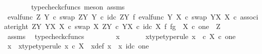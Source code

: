 \begin{isabellebody}
\ \ \ \ \ \ \isamarkupfalse%
\ {\isacharparenleft}{\kern0pt}typecheck{\isacharunderscore}{\kern0pt}cfuncs{\isacharcomma}{\kern0pt}\ meson\ assms{\isacharparenright}{\kern0pt}\isanewline
\ \ \ \ \isamarkupfalse%
\ {\isachardoublequoteopen}{\isacharparenleft}{\kern0pt}eval{\isacharunderscore}{\kern0pt}func\ Z\ Y\ {\isasymcirc}\isactrlsub c\ swap\ {\isacharparenleft}{\kern0pt}Z\isactrlbsup Y\isactrlesup {\isacharparenright}{\kern0pt}\ Y\ {\isasymcirc}\isactrlsub c\ {\isacharparenleft}{\kern0pt}id\isactrlsub c\ {\isacharparenleft}{\kern0pt}Z\isactrlbsup Y\isactrlesup {\isacharparenright}{\kern0pt}\ {\isasymtimes}\isactrlsub f\ eval{\isacharunderscore}{\kern0pt}func\ Y\ X\ {\isasymcirc}\isactrlsub c\ swap\ {\isacharparenleft}{\kern0pt}Y\isactrlbsup X\isactrlesup {\isacharparenright}{\kern0pt}\ X{\isacharparenright}{\kern0pt}\ {\isasymcirc}\isactrlsub c\ associate{\isacharunderscore}{\kern0pt}right\ {\isacharparenleft}{\kern0pt}Z\isactrlbsup Y\isactrlesup {\isacharparenright}{\kern0pt}\ {\isacharparenleft}{\kern0pt}Y\isactrlbsup X\isactrlesup {\isacharparenright}{\kern0pt}\ X\ {\isasymcirc}\isactrlsub c\ swap\ X\ {\isacharparenleft}{\kern0pt}Z\isactrlbsup Y\isactrlesup \ {\isasymtimes}\isactrlsub c\ Y\isactrlbsup X\isactrlesup {\isacharparenright}{\kern0pt}{\isacharparenright}{\kern0pt}\ {\isasymcirc}\isactrlsub c\ id\isactrlsub c\ X\ {\isasymtimes}\isactrlsub f\ {\isasymlangle}f{\isacharcomma}{\kern0pt}g{\isasymrangle}\ {\isacharcolon}{\kern0pt}\ X\ {\isasymtimes}\isactrlsub c\ one\ {\isasymrightarrow}\ Z{\isachardoublequoteclose}\isanewline
\ \ \ \ \ \ \isamarkupfalse%
\ assms\ \isamarkupfalse%
\ typecheck{\isacharunderscore}{\kern0pt}cfuncs\isanewline
\ \ \isamarkupfalse%
\isanewline
\ \ \ \ \isamarkupfalse%
\ x{}\ \isanewline
\ \ \ \ \isamarkupfalse%
\ x{}{\isacharunderscore}{\kern0pt}type{\isacharbrackleft}{\kern0pt}type{\isacharunderscore}{\kern0pt}rule{\isacharbrackright}{\kern0pt}{\isacharcolon}{\kern0pt}\ {\isachardoublequoteopen}x{}\ \ {\isasymin}\isactrlsub c\ X\ {\isasymtimes}\isactrlsub c\ one{\isachardoublequoteclose}\isanewline
\ \ \ \ \isamarkupfalse%
\ \isamarkupfalse%
\ x\ \ x{\isacharunderscore}{\kern0pt}type{\isacharbrackleft}{\kern0pt}type{\isacharunderscore}{\kern0pt}rule{\isacharbrackright}{\kern0pt}{\isacharcolon}{\kern0pt}\ {\isachardoublequoteopen}x\ {\isasymin}\isactrlsub c\ X{\isachardoublequoteclose}\ \ x{\isacharunderscore}{\kern0pt}def{\isacharcolon}{\kern0pt}\ {\isachardoublequoteopen}x{}\ {\isacharequal}{\kern0pt}\ {\isasymlangle}x{\isacharcomma}{\kern0pt}\ id\isactrlsub c\ one{\isasymrangle}{\isachardoublequoteclose}\isanewline

\end{isabellebody}
